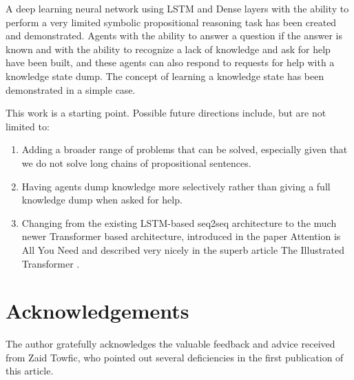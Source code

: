 \documentclass{article}
\begin{document}
A deep learning neural network using LSTM and Dense layers with the ability to perform a very limited symbolic propositional reasoning task has been created and demonstrated. Agents with the ability to answer a question if the answer is known and with the ability to recognize a lack of knowledge and ask for help have been built, and these agents can also respond to requests for help with a knowledge state dump. The concept of learning a knowledge state has been demonstrated in a simple case.

This work is a starting point. Possible future directions include, but are not limited to:

\begin{enumerate}
	\item Adding a broader range of problems that can be solved, especially given that we do not solve long chains of propositional sentences.
	\item Having agents dump knowledge more selectively rather than giving a full knowledge dump when asked for help.
	\item Changing from the existing LSTM-based seq2seq architecture to the much newer Transformer based architecture, introduced in the paper Attention is All You Need \cite{DBLP:journals/corr/VaswaniSPUJGKP17} and described very nicely in the superb article The Illustrated Transformer \cite{illustrated_transformer}.
\end{enumerate}

\section{Acknowledgements}

The author gratefully acknowledges the valuable feedback and advice received from Zaid Towfic, who pointed out several deficiencies in the first publication of this article.




\end{document}

